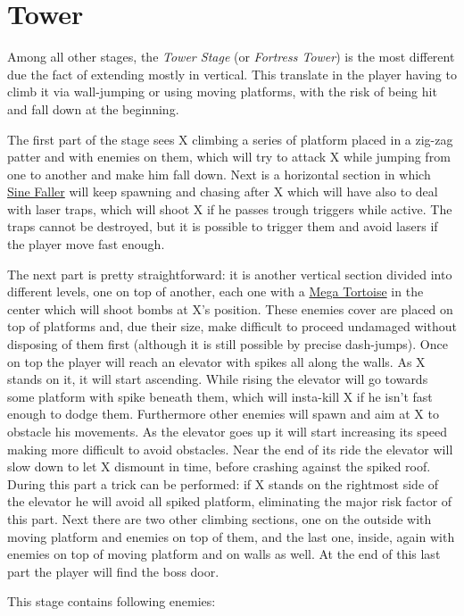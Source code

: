 \section{Tower}
Among all other stages, the \textit{Tower Stage} (or \textit{Fortress Tower}) is the most different due the fact of extending mostly in vertical. This translate in the player having to climb it via wall-jumping or using moving platforms, with the risk of being hit and fall down at the beginning.

The first part of the stage sees X climbing a series of platform placed in a zig-zag patter and with enemies on them, which will try to attack X while jumping from one to another and make him fall down. Next is a horizontal section in which \hyperlink{enem:Sine_Faller}{Sine Faller} will keep spawning and chasing after X which will have also to deal with laser traps, which will shoot X if he passes trough triggers while active. The traps cannot be destroyed, but it is possible to trigger them and avoid lasers if the player move fast enough. 

The next part is pretty straightforward: it is another vertical section divided into different levels, one on top of another, each one with a \hyperlink{enem:Mega_Tortoise}{Mega Tortoise} in the center which will shoot bombs at X's position. These enemies cover are placed on top of platforms and, due their size, make difficult to proceed undamaged without disposing of them first (although it is still possible by precise dash-jumps). Once on top the player will reach an elevator with spikes all along the walls. As X stands on it, it will start ascending. While rising the elevator will go towards some platform with spike beneath them, which will insta-kill X if he isn't fast enough to dodge them. Furthermore other enemies will spawn and aim at X to obstacle his movements. As the elevator goes up it will start increasing its speed making more difficult to avoid obstacles. Near the end of its ride the elevator will slow down to let X dismount in time, before crashing against the spiked roof. During this part a trick can be performed: if X stands on the rightmost side of the elevator he will avoid all spiked platform, eliminating the major risk factor of this part. Next there are two other climbing sections, one on the outside with moving platform and enemies on top of them, and the last one, inside, again with enemies on top of moving platform and on walls as well. At the end of this last part the player will find the boss door.

This stage contains following enemies\cite{wiki:Tower}:

